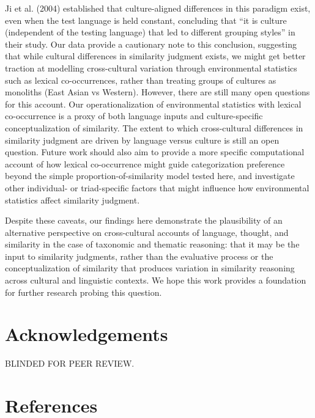 \documentclass[10pt, letterpaper]{article}
\begin{document}
Ji et al. (2004) established that culture-aligned differences in this
paradigm exist, even when the test language is held constant, concluding
that ``it is culture (independent of the testing language) that led to
different grouping styles'' in their study. Our data provide a
cautionary note to this conclusion, suggesting that while cultural
differences in similarity judgment exists, we might get better traction
at modelling cross-cultural variation through environmental statistics
such as lexical co-occurrences, rather than treating groups of cultures
as monoliths (East Asian vs Western). However, there are still many open
questions for this account. Our operationalization of environmental
statistics with lexical co-occurrence is a proxy of both language inputs
and culture-specific conceptualization of similarity. The extent to
which cross-cultural differences in similarity judgment are driven by
language versus culture is still an open question. Future work should
also aim to provide a more specific computational account of how lexical
co-occurrence might guide categorization preference beyond the simple
proportion-of-similarity model tested here, and investigate other
individual- or triad-specific factors that might influence how
environmental statistics affect similarity judgment.

Despite these caveats, our findings here demonstrate the plausibility of
an alternative perspective on cross-cultural accounts of language,
thought, and similarity in the case of taxonomic and thematic reasoning:
that it may be the input to similarity judgments, rather than the
evaluative process or the conceptualization of similarity that produces
variation in similarity reasoning across cultural and linguistic
contexts. We hope this work provides a foundation for further research
probing this question.

\hypertarget{acknowledgements}{%
\section{Acknowledgements}\label{acknowledgements}}

BLINDED FOR PEER REVIEW.

\hypertarget{references}{%
\section{References}\label{references}}

\setlength{\parindent}{-0.1in} 
\setlength{\leftskip}{0.125in}
\end{document}
